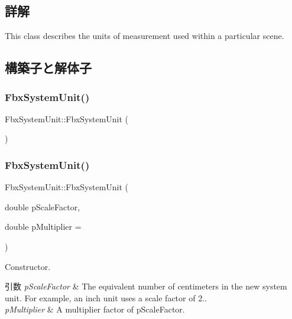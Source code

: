 \subsection{詳解}
This class describes the units of measurement used within a particular scene. 

\subsection{構築子と解体子}
\mbox{\label{class_fbx_system_unit_aec08a323b4e20c8c13fed7771370cace}} 
\subsubsection{\texorpdfstring{Fbx\+System\+Unit()}{FbxSystemUnit()}\hspace{0.1cm}{\footnotesize\ttfamily [1/2]}}
{\footnotesize\ttfamily Fbx\+System\+Unit\+::\+Fbx\+System\+Unit (\begin{DoxyParamCaption}{ }\end{DoxyParamCaption})}

\mbox{\label{class_fbx_system_unit_a6b265b9eccd00fbc09bb8064c9f3f7c4}} 
\subsubsection{\texorpdfstring{Fbx\+System\+Unit()}{FbxSystemUnit()}\hspace{0.1cm}{\footnotesize\ttfamily [2/2]}}
{\footnotesize\ttfamily Fbx\+System\+Unit\+::\+Fbx\+System\+Unit (\begin{DoxyParamCaption}\item[{double}]{p\+Scale\+Factor,  }\item[{double}]{p\+Multiplier = {} }\end{DoxyParamCaption})}

Constructor. 
\begin{DoxyParams}{引数}
{\em p\+Scale\+Factor} & The equivalent number of centimeters in the new system unit. For example, an inch unit uses a scale factor of 2.. \\
\hline
{\em p\+Multiplier} & A multiplier factor of p\+Scale\+Factor. \\
\hline
\end{DoxyParams}
\mbox{\label{class_fbx_system_unit_a151549b75cf9aadef6c943adb814122f}} 
